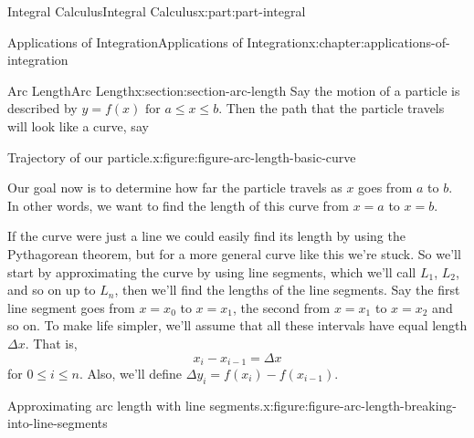 \documentclass[twoside,10pt,]{book}
\numberwithin{equation}{part}
\begin{document}
\begin{partptx}{Integral Calculus}{}{Integral Calculus}{}{}{x:part:part-integral}
\begin{chapterptx}{Applications of Integration}{}{Applications of Integration}{}{}{x:chapter:applications-of-integration}
\typeout{************************************************}
%
\begin{sectionptx}{Arc Length}{}{Arc Length}{}{}{x:section:section-arc-length}
Say the motion of a particle is described by \(y = f(x) \text{ for } a \leq x \leq b.\) Then the path that the particle travels will look like a curve, say \begin{figureptx}{Trajectory of our particle.}{x:figure:figure-arc-length-basic-curve}{}%
\begin{image}{0}{1}{0}%
%
\end{image}%
\tcblower
\end{figureptx}%
%
\par
Our goal now is to determine how far the particle travels as \(x\) goes from \(a\) to \(b\). In other words, we want to find the length of this curve from \(x=a\) to \(x=b\).%
\par
If the curve were just a line we could easily find its length by using the Pythagorean theorem, but for a more general curve like this we're stuck. So we'll start by approximating the curve by using line segments, which we'll call \(L_1\), \(L_2\), and so on up to \(L_{n}\), then we'll find the lengths of the line segments. Say the first line segment goes from \(x=x_0\) to \(x=x_1\), the second from \(x=x_1\) to \(x=x_2\) and so on. To make life simpler, we'll assume that all these intervals have equal length \(\Delta x\). That is,%
\begin{equation*}
x_{i} - x_{i-1}  = \Delta x
\end{equation*}
for \(0 \leq i\leq n\). Also, we'll define \(\Delta y_{i} = f(x_{i}) - f(x_{i-1})\).%
\begin{figureptx}{Approximating arc length with line segments.}{x:figure:figure-arc-length-breaking-into-line-segments}{}%
\begin{image}{0}{1}{0}%
\end{image}
\end{figureptx}
\end{sectionptx}
\end{chapterptx}
\end{partptx}
\end{document}
